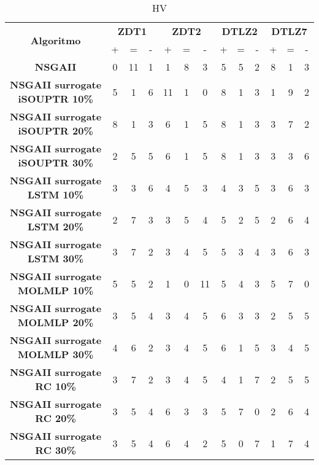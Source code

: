 \begin{table}[h]
\centering
\begin{tabular}{|c|ccc|ccc|ccc|ccc|}
\hline\multirow{2}{*}{\textbf{Algoritmo}} & \multicolumn{3}{c|}{\textbf{ZDT1}} & \multicolumn{3}{c|}{\textbf{ZDT2}} & \multicolumn{3}{c|}{\textbf{DTLZ2}} & \multicolumn{3}{c|}{\textbf{DTLZ7}} \\ \cline{2-13}& + & = & - & + & = & - & + & = & - & + & = & - \\ \hline
\textbf{NSGAII} & 0 & 11 & 1 & 1 & 8 & 3 & 5 & 5 & 2 & 8 & 1 & 3\\
\textbf{NSGAII surrogate iSOUPTR 10\%} & 5 & 1 & 6 & 11 & 1 & 0 & 8 & 1 & 3 & 1 & 9 & 2\\
\textbf{NSGAII surrogate iSOUPTR 20\%} & 8 & 1 & 3 & 6 & 1 & 5 & 8 & 1 & 3 & 3 & 7 & 2\\
\textbf{NSGAII surrogate iSOUPTR 30\%} & 2 & 5 & 5 & 6 & 1 & 5 & 8 & 1 & 3 & 3 & 3 & 6\\
\textbf{NSGAII surrogate LSTM 10\%} & 3 & 3 & 6 & 4 & 5 & 3 & 4 & 3 & 5 & 3 & 6 & 3\\
\textbf{NSGAII surrogate LSTM 20\%} & 2 & 7 & 3 & 3 & 5 & 4 & 5 & 2 & 5 & 2 & 6 & 4\\
\textbf{NSGAII surrogate LSTM 30\%} & 3 & 7 & 2 & 3 & 4 & 5 & 5 & 3 & 4 & 3 & 6 & 3\\
\textbf{NSGAII surrogate MOLMLP 10\%} & 5 & 5 & 2 & 1 & 0 & 11 & 5 & 4 & 3 & 5 & 7 & 0\\
\textbf{NSGAII surrogate MOLMLP 20\%} & 3 & 5 & 4 & 3 & 4 & 5 & 6 & 3 & 3 & 2 & 5 & 5\\
\textbf{NSGAII surrogate MOLMLP 30\%} & 4 & 6 & 2 & 3 & 4 & 5 & 6 & 1 & 5 & 3 & 4 & 5\\
\textbf{NSGAII surrogate RC 10\%} & 3 & 7 & 2 & 3 & 4 & 5 & 4 & 1 & 7 & 2 & 5 & 5\\
\textbf{NSGAII surrogate RC 20\%} & 3 & 5 & 4 & 6 & 3 & 3 & 5 & 7 & 0 & 2 & 6 & 4\\
\textbf{NSGAII surrogate RC 30\%} & 3 & 5 & 4 & 6 & 4 & 2 & 5 & 0 & 7 & 1 & 7 & 4\\
\hline
\end{tabular}
\caption{HV}
\label{tabla:comparacion_HV}
\end{table}